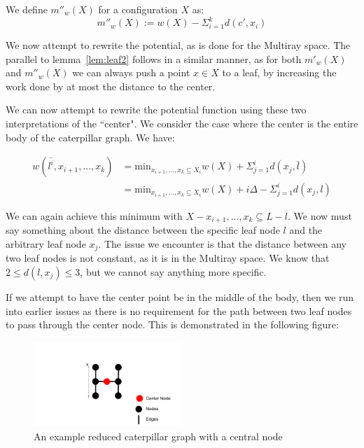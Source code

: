 \begin{definition}
    We define $m''_w(X)$ for a configuration $X$ as:
    \begin{equation*}
        m''_w(X) := w(X) - \Sigma_{i=1} ^ k d(c', x_i)
    \end{equation*}
\end{definition}

We now attempt to rewrite the potential, as is done for the Multiray space. The parallel to lemma~\ref{lem:leaf2} follows in a similar manner, as for both $m'_w(X)$ and $m''_w(X)$ we can always push a point $x \in X$ to a leaf, by increasing the work done by at most the distance to the center.

We can now attempt to rewrite the potential function using these two interpretations of the ``center". We consider the case where the center is the entire body of the caterpillar graph. We have:

\begin{equation*}
    \begin{split}
    w(\bar{l^i}, x_{i+1}, ..., x_k) &= \mathrm{min}_{x_{i+1}, ..., x_k \subseteq X_i} w(X) + \Sigma_{j=1}^i d(x_j, \bar{l})\\
    &= \mathrm{min}_{x_{i+1}, ..., x_k \subseteq X_i} w(X) + i\Delta - \Sigma_{j=1}^i d(x_j, l)
    \end{split}
\end{equation*}

We can again achieve this minimum with $X-x_{i+1}, ..., x_k\subseteq L-l$. We now must say something about the distance between the specific leaf node $l$ and the arbitrary leaf node $x_j$. The issue we encounter is that the distance between any two leaf nodes is not constant, as it is in the Multiray space. We know that $2 \leq d(l, x_j) \leq 3$, but we cannot say anything more specific. 

If we attempt to have the center point be in the middle of the body, then we run into earlier issues as there is no requirement for the path between two leaf nodes to pass through the center node. This is demonstrated in the following figure:

\begin{figure}[H]
    \centering
    \includegraphics[width=0.5\textwidth]{images/center2.png}
    \caption{An example reduced caterpillar graph with a central node}
\end{figure}

